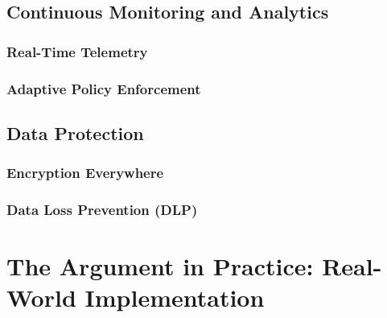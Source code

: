 \documentclass[12pt, letterpaper]{article}
\begin{document}
\subsection{Continuous Monitoring and Analytics}

    \subsubsection{Real-Time Telemetry}

    \subsubsection{Adaptive Policy Enforcement}

\subsection{Data Protection}

    \subsubsection{Encryption Everywhere}

    \subsubsection{Data Loss Prevention (DLP)}

\section{The Argument in Practice: Real-World Implementation}
\end{document}
